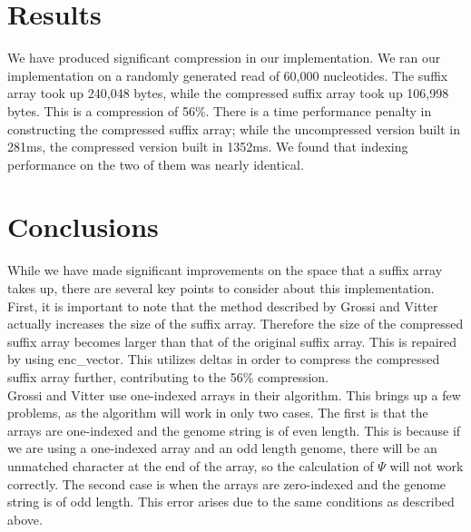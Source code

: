 \documentclass{article}
\begin{document}
\section{Results}
\label{sec-results}
We have produced significant compression in our implementation. We ran our implementation on a randomly generated read of 60,000 nucleotides. The suffix array took up 240,048 bytes, while the compressed suffix array took up 106,998 bytes. This is a compression of 56\%. There is a time performance penalty in constructing the compressed suffix array; while the uncompressed version built in 281ms, the compressed version built in 1352ms. We found that indexing performance on the two of them was nearly identical.\\
\section{Conclusions}
\label{sec-conclusions}
While we have made significant improvements on the space that a suffix array takes up, there are several key points to consider about this implementation.\\
\indent First, it is important to note that the method described by Grossi and Vitter actually increases the size of the suffix array. Therefore the size of the compressed suffix array becomes larger than that of the original suffix array. This is repaired by using enc\_vector. This utilizes deltas in order to compress the compressed suffix array further, contributing to the 56\% compression.\\
\indent Grossi and Vitter use one-indexed arrays in their algorithm. This brings up a few problems, as the algorithm will work in only two cases. The first is that the arrays are one-indexed and the genome string is of even length. This is because if we are using a one-indexed array and an odd length genome, there will be an unmatched character at the end of the array, so the calculation of $\Psi$ will not work correctly. The second case is when the arrays are zero-indexed and the genome string is of odd length. This error arises due to the same conditions as described above.\\
\end{document}
